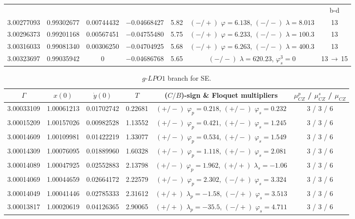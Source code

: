 \documentclass[reqno, 11pt]{amsart}
\theoremstyle{plain}
\theoremstyle{definition}
\theoremstyle{remark}
\begin{document}
\begin{table}[h]
{\begin{tabular}{c|c|c|c|c|c|c}
         & & & & & & b-d \\
        3.00277093 & 0.99302677 & 0.00744432 & $-$0.04668427 & 5.82 & $(-/+)$ $\varphi = 6.138$, $(-/-)$ $\lambda = 8.013$ & 13 \\
        3.00296373 & 0.99201168 & 0.00567451 & $-$0.04755480 & 5.75	& $(-/+)$ $\varphi = 6.233$, $(-/-)$ $\lambda = 100.3$ & 13 \\
        3.00316033 & 0.99081340 & 0.00306250 & $-$0.04704925 & 5.68 & $(-/+)$ $\varphi = 6.263$, $(-/-)$ $\lambda = 400.3$ & 13 \\
        3.00323697 & 0.99035942 & 0 & $-$0.04686768 & 5.65 & $(-/-)$ $\lambda = 620.23$, $\varphi_s^3 = 0$ & 13$\,\to\,$15
	\end{tabular}}
	\label{data_lpo1_3rd_cover_2}
\end{table}


\begin{table}[htbp]\fontsize{10}{10}\selectfont \centering
\caption{$g$-$LPO1$ branch for SE.}
\begin{tabular}{c|c|c|c|c|c}
\hline 
	$\Gamma$ & $x(0)$ & $\dot{y}(0)$ & $T$ & ($C/B$)-sign \& Floquet multipliers & $\mu_{CZ}^p$ / $\mu_{CZ}^s$ / $\mu_{CZ}$\\
	\hline 3.00033109 & 1.00061213 & 0.01702742 & 0.22681 & $(+/-)$ $\varphi_p = 0.218$, $(+/-)$ $\varphi_s = 0.232$ & 3 / 3 / 6\\
    3.00015209 & 1.00157026 & 0.00982528 & 1.13552 & $(+/-)$ $\varphi_p = 0.421$, $(+/-)$ $\varphi_s = 1.245$ & 3 / 3 / 6\\
    3.00014609 & 1.00109981 & 0.01422219 & 1.33077 & $(+/-)$ $\varphi_p = 0.534$, $(+/-)$ $\varphi_s = 1.549$ & 3 / 3 / 6 \\
    3.00014309 & 1.00076095 & 0.01889960 & 1.60328 & $(+/-)$ $\varphi_p = 1.118$, $(+/-)$ $\varphi_s = 2.081$ & 3 / 3 / 6 \\
    3.00014089 & 1.00047925 & 0.02552883 & 2.13798 & $(+/-)$ $\varphi_p = 1.962$, $(+/+)$ $\lambda_s = -1.06$ & 3 / 3 / 6 \\
    3.00014069 & 1.00044659 & 0.02664172 & 2.22579 & $(+/-)$ $\varphi_p = 2.302$, $(-/+)$ $\varphi_s = 3.324$ & 3 / 3 / 6 \\
    3.00014049 & 1.00041446 & 0.02785333 & 2.31612 & $(+/+)$ $\lambda_p = -1.58$, $(-/+)$ $\varphi_s = 3.513$ & 3 / 3 / 6 \\
    3.00013817 & 1.00020619 & 0.04126365 & 2.90065 & $(+/+)$ $\lambda_p = -35.5$, $(-/+)$ $\varphi_s = 4.711$ & 3 / 3 / 6
\end{tabular}
\label{data_g_lpo1_s_e}
\end{table}
\end{document}
